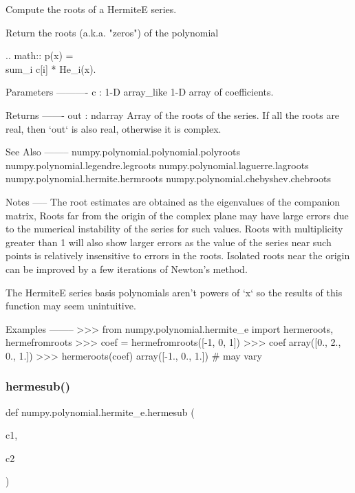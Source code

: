 \begin{DoxyVerb}Compute the roots of a HermiteE series.

Return the roots (a.k.a. "zeros") of the polynomial

.. math:: p(x) = \\sum_i c[i] * He_i(x).

Parameters
----------
c : 1-D array_like
    1-D array of coefficients.

Returns
-------
out : ndarray
    Array of the roots of the series. If all the roots are real,
    then `out` is also real, otherwise it is complex.

See Also
--------
numpy.polynomial.polynomial.polyroots
numpy.polynomial.legendre.legroots
numpy.polynomial.laguerre.lagroots
numpy.polynomial.hermite.hermroots
numpy.polynomial.chebyshev.chebroots

Notes
-----
The root estimates are obtained as the eigenvalues of the companion
matrix, Roots far from the origin of the complex plane may have large
errors due to the numerical instability of the series for such
values. Roots with multiplicity greater than 1 will also show larger
errors as the value of the series near such points is relatively
insensitive to errors in the roots. Isolated roots near the origin can
be improved by a few iterations of Newton's method.

The HermiteE series basis polynomials aren't powers of `x` so the
results of this function may seem unintuitive.

Examples
--------
>>> from numpy.polynomial.hermite_e import hermeroots, hermefromroots
>>> coef = hermefromroots([-1, 0, 1])
>>> coef
array([0., 2., 0., 1.])
>>> hermeroots(coef)
array([-1.,  0.,  1.]) # may vary\end{DoxyVerb}
 \mbox{\label{namespacenumpy_1_1polynomial_1_1hermite__e_a964e0d1ada0545b0612243777d259194}} 
\subsubsection{\texorpdfstring{hermesub()}{hermesub()}}
{\footnotesize\ttfamily def numpy.\+polynomial.\+hermite\+\_\+e.\+hermesub (\begin{DoxyParamCaption}\item[{}]{c1,  }\item[{}]{c2 }\end{DoxyParamCaption})}

